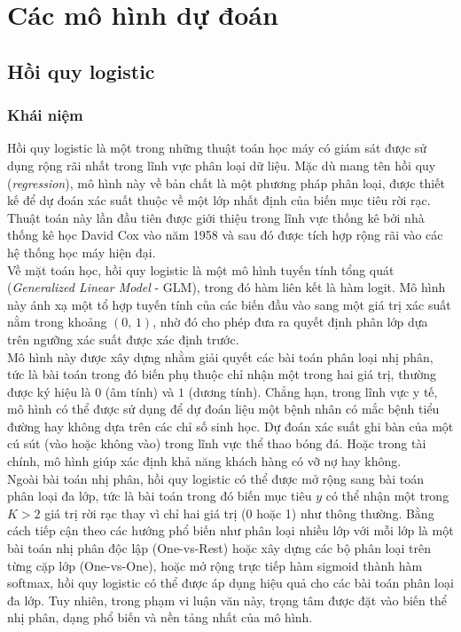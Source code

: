 \section{Các mô hình dự đoán}
\subsection{Hồi quy logistic}
\subsubsection{Khái niệm}
 
Hồi quy logistic là một trong những thuật toán học máy có giám sát được sử dụng rộng rãi nhất trong lĩnh vực phân loại dữ liệu. Mặc dù mang tên hồi quy (\textit{regression}), mô hình này về bản chất là một phương pháp phân loại, được thiết kế để dự đoán xác suất thuộc về một lớp nhất định của biến mục tiêu rời rạc. Thuật toán này lần đầu tiên được giới thiệu trong lĩnh vực thống kê bởi nhà thống kê học David Cox vào năm 1958 và sau đó được tích hợp rộng rãi vào các hệ thống học máy hiện đại. \\
 
Về mặt toán học, hồi quy logistic là một mô hình tuyến tính tổng quát (\textit{Generalized Linear Model} - GLM), trong đó hàm liên kết là hàm logit. Mô hình này ánh xạ một tổ hợp tuyến tính của các biến đầu vào sang một giá trị xác suất nằm trong khoảng $(0,\,1)$, nhờ đó cho phép đưa ra quyết định phân lớp dựa trên ngưỡng xác suất được xác định trước. \\

Mô hình này được xây dựng nhằm giải quyết các bài toán phân loại nhị phân, tức là bài toán trong đó biến phụ thuộc chỉ nhận một trong hai giá trị, thường được ký hiệu là $0$ (âm tính) và $1$ (dương tính). Chẳng hạn, trong lĩnh vực y tế, mô hình có thể được sử dụng để dự đoán liệu một bệnh nhân có mắc bệnh tiểu đường hay không dựa trên các chỉ số sinh học. Dự đoán xác suất ghi bàn của một cú sút (vào hoặc không vào) trong lĩnh vực thể thao bóng đá. Hoặc trong tài chính, mô hình giúp xác định khả năng khách hàng có vỡ nợ hay không.\\

Ngoài bài toán nhị phân, hồi quy logistic có thể được mở rộng sang bài toán phân loại đa lớp, tức là bài toán trong đó biến mục tiêu $y$ có thể nhận một trong $K > 2$ giá trị rời rạc thay vì chỉ hai giá trị (0 hoặc 1) như thông thường. Bằng cách tiếp cận theo các hướng phổ biến như phân loại nhiều lớp với mỗi lớp là một bài toán nhị phân độc lập (One-vs-Rest) hoặc xây dựng các bộ phân loại trên từng cặp lớp (One-vs-One), hoặc mở rộng trực tiếp hàm sigmoid thành hàm softmax, hồi quy logistic có thể được áp dụng hiệu quả cho các bài toán phân loại đa lớp. Tuy nhiên, trong phạm vi luận văn này, trọng tâm được đặt vào biến thể nhị phân, dạng phổ biến và nền tảng nhất của mô hình.\\


